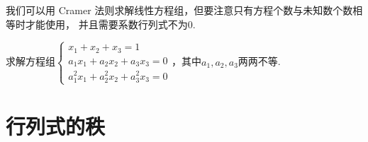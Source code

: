 我们可以用 Cramer 法则求解线性方程组，但要注意只有方程个数与未知数个数相等时才能使用，
并且需要系数行列式不为0.
\begin{example}
    求解方程组$\begin{cases}
        x_1+x_2+x_3=1 \\
        a_1x_1+a_2x_2+a_3x_3=0 \\
        a_1^2x_1+a_2^2x_2+a_3^2x_3=0
    \end{cases}$，其中$a_1,a_2,a_3$两两不等.
\end{example}
\begin{solution}

\end{solution}

\section{行列式的秩}
